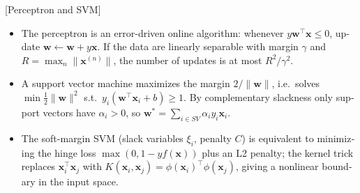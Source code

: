 \begin{english}[Perceptron and SVM]
\begin{itemize}
\item The perceptron is an error-driven online algorithm: whenever $y\bm w^\top\bm x\le0$, update $\bm w\leftarrow\bm w+y\bm x$. If the data are linearly separable with margin $\gamma$ and $R=\max_n\|\bm x^{(n)}\|$, the number of updates is at most $R^2/\gamma^2$.
\item A support vector machine maximizes the margin $2/\|\bm w\|$, i.e.\ solves $\min\frac12\|\bm w\|^2$ s.t.\ $y_i(\bm w^\top\bm x_i+b)\ge1$. By complementary slackness only support vectors have $\alpha_i>0$, so $\bm w^*=\sum_{i\in SV}\alpha_iy_i\bm x_i$.
\item The soft-margin SVM (slack variables $\xi_i$, penalty $C$) is equivalent to minimizing the hinge loss $\max(0,1-yf(\bm x))$ plus an L2 penalty; the kernel trick replaces $\bm x_i^\top\bm x_j$ with $K(\bm x_i,\bm x_j)=\phi(\bm x_i)^\top\phi(\bm x_j)$, giving a nonlinear boundary in the input space.
\end{itemize}
\end{english}
